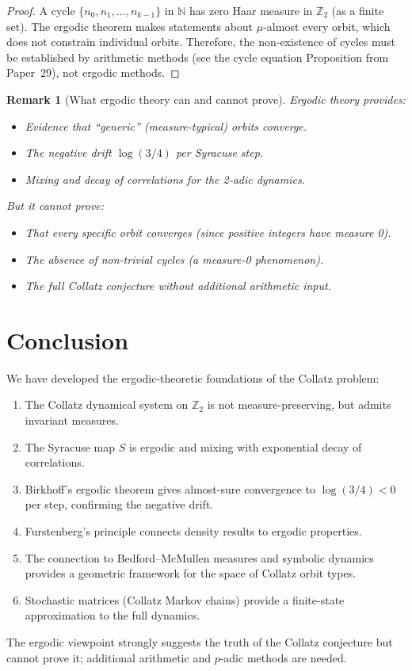 \documentclass[12pt,a4paper]{article}
\newtheorem{remark}[theorem]{Remark}
\begin{document}
\begin{proof}
A cycle $\{n_0, n_1, \ldots, n_{k-1}\}$ in $\mathbb{N}$ has zero Haar measure in
$\mathbb{Z}_2$ (as a finite set). The ergodic theorem makes statements about $\mu$-almost
every orbit, which does not constrain individual orbits. Therefore, the non-existence of
cycles must be established by arithmetic methods (see the cycle equation
Proposition from Paper~29), not ergodic methods.
\end{proof}

\begin{remark}[What ergodic theory can and cannot prove]\label{rem:ergodic_limits}
Ergodic theory provides:
\begin{itemize}
  \item Evidence that ``generic'' (measure-typical) orbits converge.
  \item The negative drift $\log(3/4)$ per Syracuse step.
  \item Mixing and decay of correlations for the 2-adic dynamics.
\end{itemize}
But it cannot prove:
\begin{itemize}
  \item That every \emph{specific} orbit converges (since positive integers have measure 0).
  \item The absence of non-trivial cycles (a measure-0 phenomenon).
  \item The full Collatz conjecture without additional arithmetic input.
\end{itemize}
\end{remark}

\section{Conclusion}

We have developed the ergodic-theoretic foundations of the Collatz problem:
\begin{enumerate}
  \item The Collatz dynamical system on $\mathbb{Z}_2$ is not measure-preserving,
        but admits invariant measures.
  \item The Syracuse map $S$ is ergodic and mixing with exponential decay of correlations.
  \item Birkhoff's ergodic theorem gives almost-sure convergence to $\log(3/4) < 0$
        per step, confirming the negative drift.
  \item Furstenberg's principle connects density results to ergodic properties.
  \item The connection to Bedford--McMullen measures and symbolic dynamics provides
        a geometric framework for the space of Collatz orbit types.
  \item Stochastic matrices (Collatz Markov chains) provide a finite-state approximation
        to the full dynamics.
\end{enumerate}
The ergodic viewpoint strongly suggests the truth of the Collatz conjecture but cannot
prove it; additional arithmetic and $p$-adic methods are needed.
\end{document}
